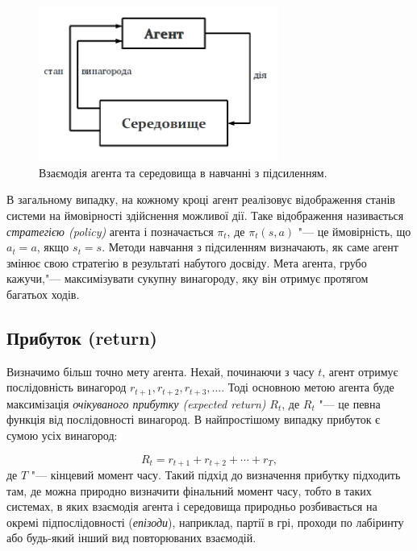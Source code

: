 \begin{figure}[!h]\begin{center}
\includegraphics[width=0.7\textwidth]{agent_env_diagram.png}
\caption{Взаємодія агента та середовища в навчанні з підсиленням.}
\end{center}\end{figure}

В загальному випадку, на кожному кроці агент реалізовує відображення станів системи на ймовірності здійснення можливої дії. Таке відображення називається \emph{стратегією (policy)} агента і позначається $\pi_t$, де $\pi_t(s,a)$ "--- це ймовірність, що $a_t=a$, якщо $s_t = s$. Методи навчання з підсиленням визначають, як саме агент змінює свою стратегію в результаті набутого досвіду. Мета агента, грубо кажучи,"--- максимізувати сукупну винагороду, яку він отримує протягом багатьох ходів.

\subsection{Прибуток (return)}

Визначимо більш точно мету агента. Нехай, починаючи з часу $t$, агент отримує послідовність винагород $r_{t+1}, r_{t+2}, r_{t+3}, \ldots$. Тоді основною метою агента буде максимізація \emph{очікуваного прибутку (expected return)} $R_t$, де $R_t$ "--- це певна функція від послідовності винагород. В найпростішому випадку прибуток є сумою усіх винагород:

\begin{equation}
R_t = r_{t+1} + r_{t+2} + \cdots + r_T,
\end{equation}
де $T$ "--- кінцевий момент часу. Такий підхід до визначення прибутку підходить там, де можна природно визначити фінальний момент часу, тобто в таких системах, в яких взаємодія агента і середовища природньо розбивається на окремі підпослідовності (\emph{епізоди}), наприклад, партії в грі, проходи по лабіринту або будь-який інший вид повторюваних взаємодій.

